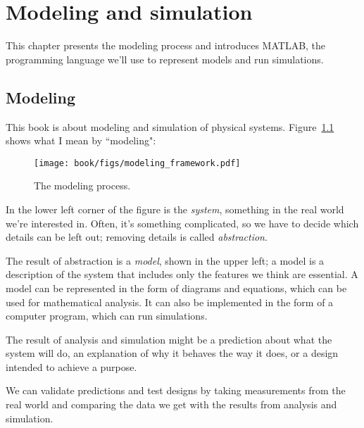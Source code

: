 \chapter{Modeling and simulation}
\label{modeling}

\minitoc{}

This chapter presents the modeling process and introduces MATLAB, the programming language we'll use to represent models and run simulations.


\section{Modeling}

This book is about modeling and simulation of physical systems.  
Figure~\ref{fig:modeling} shows what I mean by ``modeling":


\begin{figure}[h]
  \texttt{[image: book/figs/modeling\_framework.pdf]} 
  \caption{The modeling process.}
  \label{fig:modeling}
\end{figure}

In the lower left corner of the figure is the \emph{system}, something in the real world we're interested in.  Often, it's something complicated, so we have to decide which 
details can be left out; removing details is called \emph{abstraction}.  


The result of abstraction is a \emph{model}, shown in the upper left; a model is a description of the system that includes only the features we think are essential.  A model can be represented in the form of diagrams and equations, which can be used for mathematical analysis.  It can also be implemented in the form of a computer program, which can run simulations.


The result of analysis and simulation might be a prediction about what the system will do, an explanation of why it behaves the way it does, or a design intended to achieve a purpose.  


We can validate predictions and test designs by taking measurements from the real world and comparing the data we get with the results from analysis and simulation.


